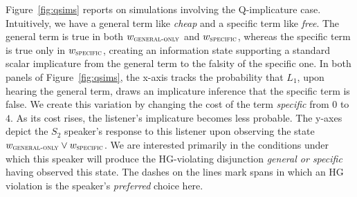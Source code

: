 \documentclass[12pt,twoside]{article}
\newcommand{\Figref}[1]{Figure~\ref{#1}}
\newcommand{\figref}[1]{Figure~\ref{#1}}
\newcommand{\word}[1]{\emph{#1}}
\newcommand{\SpeakerK}[1][k]{S_{#1}}
\newcommand{\ListenerK}[1][k]{L_{#1}}
\renewcommand{\_}{\textbf{\textunderscore\hspace{-4pt}\textunderscore\hspace{-3pt}\textunderscore\hspace{-4pt}\textunderscore}\hspace{0.5pt}}			%
\begin{document}
\Figref{fig:qsims} reports on simulations involving the Q-implicature
case. Intuitively, we have a general term like \word{cheap} and a
specific term like \word{free}. The general term is true in both
$w_\textsc{general-only}$ and $w_\textsc{specific}$, whereas the
specific term is true only in $w_\textsc{specific}$, creating an
information state supporting a standard scalar implicature from the
general term to the falsity of the specific one. In both panels of
\figref{fig:qsims}, the x-axis tracks the probability that
$\ListenerK[1]$, upon hearing the general term, draws an implicature
inference that the specific term is false. We create this variation by
changing the cost of the term \word{specific} from $0$ to $4$. As its
cost rises, the listener's implicature becomes less probable. The
y-axes depict the $\SpeakerK[2]$ speaker's response to this listener
upon observing the state
$w_\textsc{general-only} \vee w_\textsc{specific}$. We are interested
primarily in the conditions under which this speaker will produce the
HG-violating disjunction \word{general or specific} having observed
this state. The dashes on the lines mark spans in which an HG
violation is the speaker's \emph{preferred} choice here.
\end{document}
